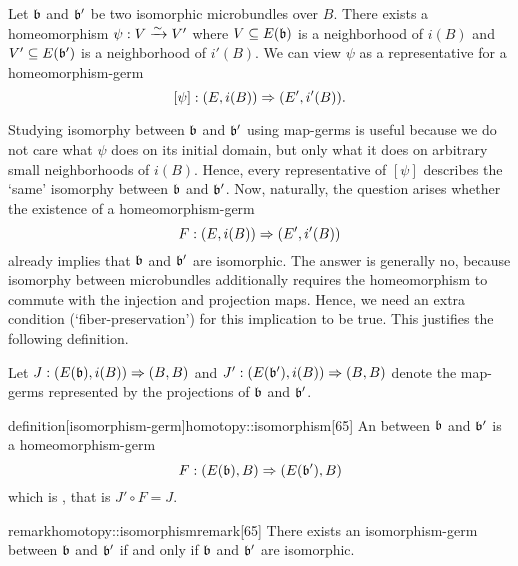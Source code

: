 \begin{myparagraph}
    Let $\bb$ and $\bb'$ be two isomorphic microbundles over $B$.
    There exists a homeomorphism $\psi: V \xrightarrow{\sim} V'$ where
    $V \sub E(\bb)$ is a neighborhood of $i(B)$
    and $V' \sub E(\bb')$ is a neighborhood of $i'(B)$.
    We can view $\psi$ as a representative for a homeomorphism-germ
    \[ [\psi]: (E, i(B)) \Rightarrow{} (E', i'(B)). \]
    
    Studying isomorphy between $\bb$ and $\bb'$
    using map-germs is useful
    because we do not care what $\psi$ does on its initial domain,
    but only what it does on arbitrary small neighborhoods of $i(B)$.
    Hence, every representative of $[\psi]$
    describes the `same' isomorphy between $\bb$ and $\bb'$.
    Now, naturally, the question arises whether
    the existence of a homeomorphism-germ
    \[ F: (E, i(B)) \Rightarrow{} (E', i'(B)) \]
    already implies that $\bb$ and $\bb'$ are isomorphic.
    The answer is generally no, because isomorphy between microbundles
    additionally requires 
    the homeomorphism to commute with the injection and projection maps.
    Hence, we need an extra condition (`fiber-preservation')
    for this implication to be true.
    This justifies the following definition.
    
    Let $\germdef{J}{(E(\bb), i(B))}{(B, B)}$ and $\germdef{J'}{(E(\bb'), i(B))}{(B, B)}$
    denote the map-germs represented by the projections of $\bb$ and $\bb'$.
\end{myparagraph}

\begin{mystatement}{definition}[isomorphism-germ]{homotopy::isomorphism}[65]
    An  between $\bb$ and $\bb'$ is a homeomorphism-germ 
    \[ \germdef{F}{(E(\bb), B)}{(E(\bb'), B)} \]
    which is , that is $J' \circ F = J$.
\end{mystatement}

\begin{mystatement}{remark}{homotopy::isomorphismremark}[65]
    There exists an isomorphism-germ between $\bb$ and $\bb'$
    if and only if $\bb$ and $\bb'$ are isomorphic.
\end{mystatement}